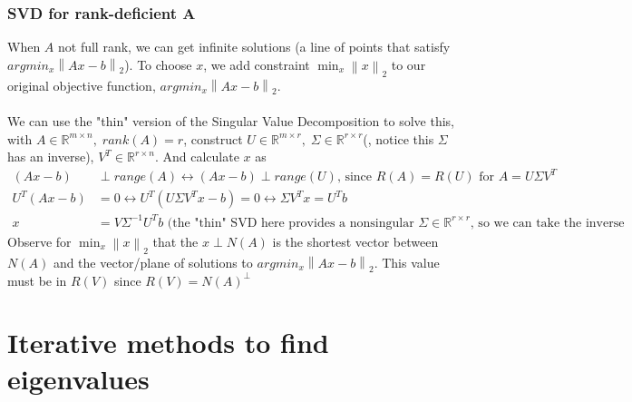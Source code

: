 \documentclass{article}
\newcommand{\norm}[2]{\left\lVert#1\right\rVert_#2}
\begin{document}
\subsubsection{SVD for rank-deficient A}
When $A$ not full rank, we can get infinite solutions (a line of points that satisfy $argmin_x\norm{Ax - b}{2}$). To choose $x$, we add constraint $\min_x \norm{x}{2}$ to our original objective function, $argmin_x\norm{Ax - b}{2}$.\\ \\
We can use the "thin" version of the Singular Value Decomposition to solve this, with $A \in \mathbb{R}^{m \times n}, \; rank(A) = r$, construct $U \in \mathbb{R}^{m \times r}, \; \Sigma \in \mathbb{R}^{r \times r}$(, notice this $\Sigma$ has an inverse), $V^T \in \mathbb{R}^{r \times n}$. And calculate $x$ as
\begin{align*}
    (Ax-b) &\perp range(A) \longleftrightarrow (Ax-b) \perp range(U) \textrm{, since $R(A) = R(U)$ for $A=U\Sigma V^T$}\\
    U^T(Ax-b) &= 0 \longleftrightarrow U^T(U\Sigma V^Tx - b) = 0 \longleftrightarrow \Sigma V^Tx = U^Tb\\ 
    x &= V\Sigma^{-1}U^Tb \textrm{ (the "thin" SVD here provides a nonsingular $\Sigma\in \mathbb{R}^{r \times r}$, so we can take the inverse}
\end{align*}
Observe for $\min_x \norm{x}{2}$ that the $x \perp N(A)$ is the shortest vector between $N(A)$ and the vector/plane of solutions to $argmin_x\norm{Ax - b}{2}$. This value must be in $R(V)$ since $R(V) = N(A)^\perp$


\section{Iterative methods to find eigenvalues}
\end{document}
